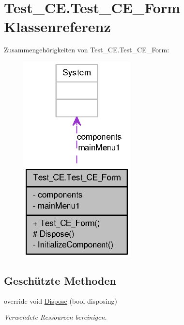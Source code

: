 \hypertarget{class_test___c_e_1_1_test___c_e___form}{
\section{Test\_\-CE.Test\_\-CE\_\-Form Klassenreferenz}
\label{class_test___c_e_1_1_test___c_e___form}
}


Zusammengehörigkeiten von Test\_\-CE.Test\_\-CE\_\-Form:\nopagebreak
\begin{figure}[H]
\begin{center}
\leavevmode
\includegraphics[width=166pt]{class_test___c_e_1_1_test___c_e___form__coll__graph}
\end{center}
\end{figure}
\subsection*{Geschützte Methoden}
\begin{DoxyCompactItemize}
\item 
override void \hyperlink{class_test___c_e_1_1_test___c_e___form_aae767bb52af6d4e5a187f8810fea9d2f}{Dispose} (bool disposing)
\begin{DoxyCompactList}\small\item\em Verwendete Ressourcen bereinigen. \item\end{DoxyCompactList}\end{DoxyCompactItemize}



